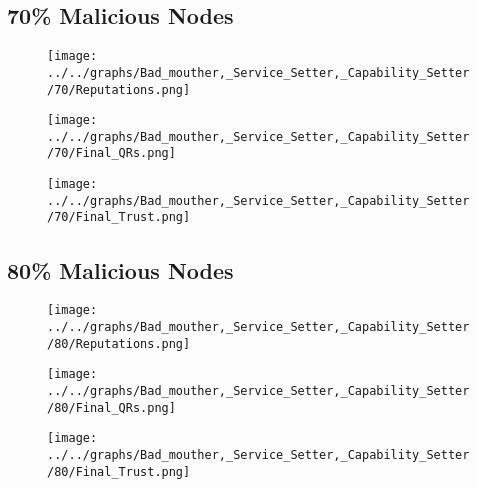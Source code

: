 \begin{minipage}[t]{0.49\columnwidth}
\subsection*{70\% Malicious Nodes}
    \begin{figure}[H]
        \centering
        \texttt{[image: ../../graphs/Bad\_mouther,\_Service\_Setter,\_Capability\_Setter/70/Reputations.png]}
    \end{figure}
    \begin{figure}[H]
        \centering
        \texttt{[image: ../../graphs/Bad\_mouther,\_Service\_Setter,\_Capability\_Setter/70/Final\_QRs.png]}
    \end{figure}
\end{minipage}
\begin{minipage}[t]{0.49\columnwidth}
    \begin{figure}[H]
        \centering
        \texttt{[image: ../../graphs/Bad\_mouther,\_Service\_Setter,\_Capability\_Setter/70/Final\_Trust.png]}
    \end{figure}
\end{minipage}

\begin{minipage}[t]{0.49\columnwidth}
\subsection*{80\% Malicious Nodes}
    \begin{figure}[H]
        \centering
        \texttt{[image: ../../graphs/Bad\_mouther,\_Service\_Setter,\_Capability\_Setter/80/Reputations.png]}
    \end{figure}
    \begin{figure}[H]
        \centering
        \texttt{[image: ../../graphs/Bad\_mouther,\_Service\_Setter,\_Capability\_Setter/80/Final\_QRs.png]}
    \end{figure}
\end{minipage}
\begin{minipage}[t]{0.49\columnwidth}
    \begin{figure}[H]
        \centering
        \texttt{[image: ../../graphs/Bad\_mouther,\_Service\_Setter,\_Capability\_Setter/80/Final\_Trust.png]}
    \end{figure}
\end{minipage}

